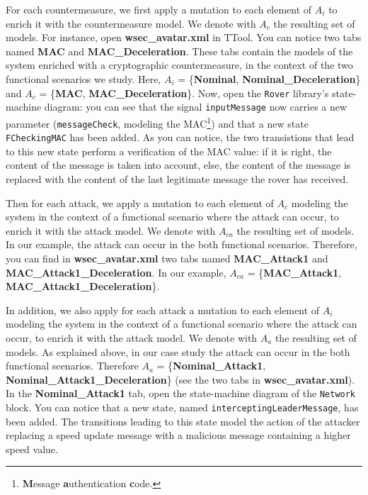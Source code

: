 \documentclass{article}
\begin{document}
For each countermeasure, we first apply a mutation to each element of $A_i$ to enrich it with the countermeasure model. We denote with $A_c$ the resulting set of models. For instance, open \textbf{wsec\_avatar.xml} in TTool. You can notice two tabs named \textbf{MAC} and \textbf{MAC\_Deceleration}. These tabs contain the models of the system enriched with a cryptographic countermeasure, in the context of the two functional scenarios we study. Here, $A_i$ = \{\textbf{Nominal}, \textbf{Nominal\_Deceleration}\} and $A_c$ = \{\textbf{MAC}, \textbf{MAC\_Deceleration}\}. Now, open the \texttt{Rover} library's state-machine diagram: you can see that the signal \texttt{inputMessage} now carries a new parameter (\texttt{messageCheck}, modeling the MAC\footnote{\textbf{M}essage \textbf{a}uthentication \textbf{c}ode.}) and that a new state \texttt{FCheckingMAC} has been added. As you can notice, the two transistions that lead to this new state perform a verification of the MAC value: if it is right, the content of the message is taken into account, else, the content of the message is replaced with the content of the last legitimate message the rover has received.

Then for each attack, we apply a mutation to each element of $A_c$ modeling the system in the context of a functional scenario where the attack can occur, to enrich it with the attack model. We denote with $A_{c a}$ the resulting set of models. In our example, the attack can occur in the both functional scenarios. Therefore, you can find in \textbf{wsec\_avatar.xml} two tabs named \textbf{MAC\_Attack1} and \textbf{MAC\_Attack1\_Deceleration}. In our example, $A_{c a}$ = \{\textbf{MAC\_Attack1}, \textbf{MAC\_Attack1\_Deceleration}\}.

In addition, we also apply for each attack a mutation to each element of $A_i$ modeling the system in the context of a functional scenario where the attack can occur, to enrich it with the attack model. We denote with $A_a$ the resulting set of models. As explained above, in our case study the attack can occur in the both functional scenarios. Therefore $A_a$ = \{\textbf{Nominal\_Attack1}, \textbf{Nominal\_Attack1\_Deceleration}\} (see the two tabs in \textbf{wsec\_avatar.xml}). In the \textbf{Nominal\_Attack1} tab, open the state-machine diagram of the \texttt{Network} block. You can notice that a new state, named \texttt{interceptingLeaderMessage}, has been added. The transitions leading to this state model the action of the attacker replacing a speed update message with a malicious message containing a higher speed value.
\end{document}
